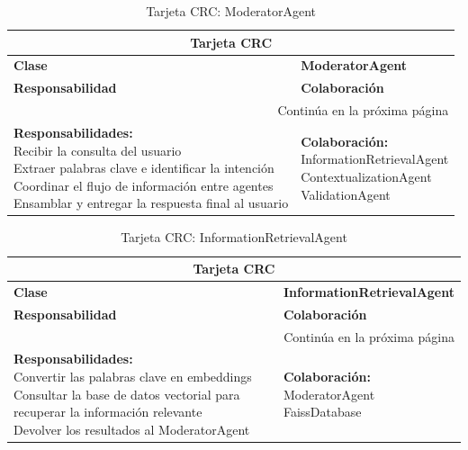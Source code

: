 \begin{longtable}{|l|l|}
	\caption{Tarjeta CRC: ModeratorAgent} \label{tablacrc1} \\
	
	\hline
	\multicolumn{2}{|c|}{\textbf{Tarjeta CRC}} \\
	\hline
	\textbf{Clase} & \textbf{ModeratorAgent} \\
	\hline
	\endfirsthead
	
	\hline
	\textbf{Responsabilidad} & \textbf{Colaboración} \\
	\hline
	\endhead
	
	\hline
	\multicolumn{2}{|r|}{Continúa en la próxima página} \\
	\hline
	\endfoot
	
	\hline
	\endlastfoot
	
	\parbox[t]{0.45\linewidth}{\textbf{Responsabilidades:} \\ 
		Recibir la consulta del usuario \\ 
		Extraer palabras clave e identificar la intención \\ 
		Coordinar el flujo de información entre agentes \\ 
		Ensamblar y entregar la respuesta final al usuario} 
	& 
	\parbox[t]{0.45\linewidth}{\textbf{Colaboración:} \\
		InformationRetrievalAgent \\ 
		ContextualizationAgent \\ 
		ValidationAgent}
\end{longtable}


\begin{longtable}{|l|l|}
	\caption{Tarjeta CRC: InformationRetrievalAgent} \label{tablacrc2} \\
	
	\hline
	\multicolumn{2}{|c|}{\textbf{Tarjeta CRC}} \\
	\hline
	\textbf{Clase} & \textbf{InformationRetrievalAgent} \\
	\hline
	\endfirsthead
	
	\hline
	\textbf{Responsabilidad} & \textbf{Colaboración} \\
	\hline
	\endhead
	
	\hline
	\multicolumn{2}{|r|}{Continúa en la próxima página} \\
	\hline
	\endfoot
	
	\hline
	\endlastfoot
	
	\parbox[t]{0.45\linewidth}{\textbf{Responsabilidades:} \\ 
		Convertir las palabras clave en embeddings \\ 
		Consultar la base de datos vectorial para recuperar la información relevante \\ 
		Devolver los resultados al ModeratorAgent} 
	& 
	\parbox[t]{0.45\linewidth}{\textbf{Colaboración:} \\
		ModeratorAgent \\ 
		FaissDatabase}
\end{longtable}

